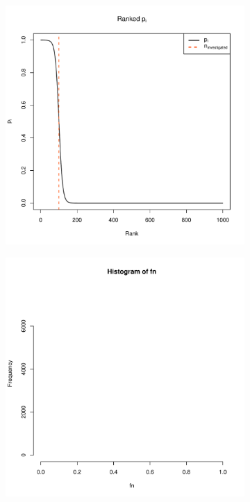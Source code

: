 \documentclass{article}
\begin{document}
\begin{figure}[!htb]
    \vspace{1em}
    
    \begin{subfigure}{0.45\textwidth}
        \centering
        \includegraphics[width=\textwidth, trim=1cm 1cm 1cm .5cm, clip]{ranked_halfhalf.pdf}
    \end{subfigure}
    \hfill
    \begin{subfigure}{0.45\textwidth}
        \centering
        \includegraphics[page=2, width=\textwidth, trim=1cm 1cm 1cm .5cm, clip]{coverage_halfhalf.pdf}
    \end{subfigure}
    

\end{figure}
\end{document}

